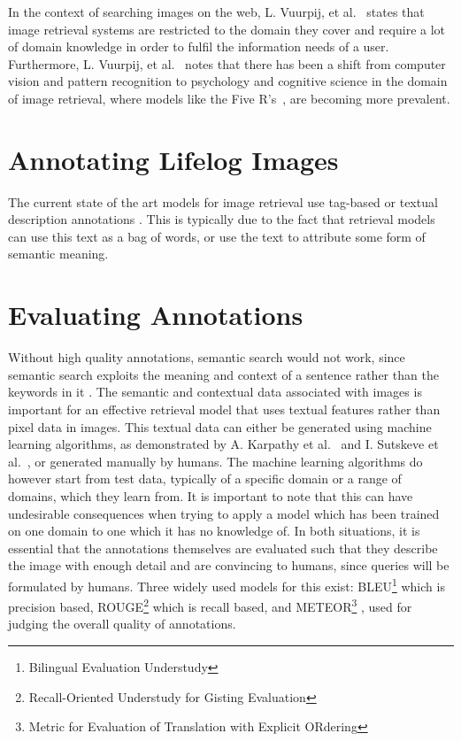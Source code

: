 In the context of searching images on the web,  L. Vuurpij, et al.~\cite{vuurpij2002vind} states that image retrieval systems are restricted to the domain they cover and require a lot of domain knowledge in order to fulfil the information needs of a user. Furthermore, L. Vuurpij, et al.~\cite{vuurpij2002vind} notes that there has been a shift from computer vision and pattern recognition to psychology and cognitive science in the domain of image retrieval, where models like the Five R's~\cite{gurrin2014lifelogging}, are becoming more prevalent. 

\section{Annotating Lifelog Images}
The current state of the art models for image retrieval use tag-based or textual description annotations \cite{ali2010semantically}. This is typically due to the fact that retrieval models can use this text as a bag of words, or use the text to attribute some form of semantic meaning.

\section{Evaluating Annotations}
Without high quality annotations, semantic search would not work, since semantic search exploits the meaning and context of a sentence rather than the keywords in it \cite{ali2010semantically}. The semantic and contextual data associated with images is important for an effective retrieval model that uses textual features rather than pixel data in images. This textual data can either be generated using machine learning algorithms, as demonstrated by A. Karpathy et al.~\cite{karpathy2015deep} and  I. Sutskeve et al.~\cite{sutskever2011generating}, or generated manually by humans. The machine learning algorithms do however start from test data, typically of a specific domain or a range of domains, which they learn from. It is important to note that this can have undesirable consequences when trying to apply a model which has been trained on one domain to one which it has no knowledge of. In both situations, it is essential that the annotations themselves are evaluated such that they describe the image with enough detail and are convincing to humans, since queries will be formulated by humans. Three widely used models for this exist: BLEU\footnote{Bilingual Evaluation Understudy} \cite{papineni2002bleu} which is precision based, ROUGE\footnote{Recall-Oriented Understudy for Gisting Evaluation} \cite{lin2004rouge} which is recall based, and METEOR\footnote{Metric for Evaluation of Translation with Explicit ORdering} \cite{elliott2013image}, used for judging the overall quality of annotations.

